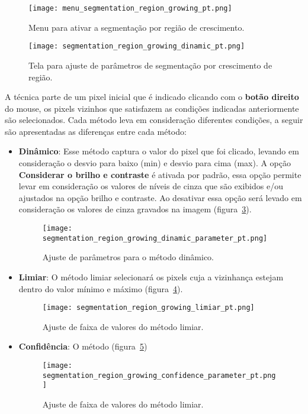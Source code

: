 \begin{figure}[!htb]
\centering
\texttt{[image: menu\_segmentation\_region\_growing\_pt.png]}
\caption{Menu para ativar a segmentação por região de crescimento.}
\label{fig:menu_segmentation_region_growing}
\end{figure}

\begin{figure}[!htb]
\centering
\texttt{[image: segmentation\_region\_growing\_dinamic\_pt.png]}
\caption{Tela para ajuste de parâmetros de segmentação por crescimento de região.}
\label{fig:segmentation_region_growing_dinamic}
\end{figure}

A técnica parte de um pixel inicial que é indicado clicando com o \textbf{botão direito} do mouse, os pixels vizinhos que satisfazem as condições indicadas anteriormente são selecionados. Cada método leva em consideração diferentes condições, a seguir são apresentadas as diferenças entre cada método:

\begin{itemize}
	\item \textbf{Dinâmico}: Esse método captura o valor do pixel que foi clicado, levando em consideração o desvio para baixo (min) e desvio para cima (max). A opção \textbf{Considerar o brilho e contraste} é ativada por padrão, essa opção permite levar em consideração os valores de níveis de cinza que são exibidos e/ou ajustados na opção brilho e contraste. Ao desativar essa opção será levado em consideração os valores de cinza gravados na imagem (figura~\ref{fig:segmentation_region_growing_dinamic_parameter}). 
	
	\begin{figure}[!htb]
	\centering
	\texttt{[image: segmentation\_region\_growing\_dinamic\_parameter\_pt.png]}
	\caption{Ajuste de parâmetros para o método dinâmico.}
	\label{fig:segmentation_region_growing_dinamic_parameter}
	\end{figure}
	
	\item \textbf{Limiar}: O método limiar selecionará os pixels cuja a vizinhança estejam dentro do valor mínimo e máximo (figura~\ref{fig:segmentation_region_growing_limiar}).

	\begin{figure}[!htb]
	\centering
	\texttt{[image: segmentation\_region\_growing\_limiar\_pt.png]}
	\caption{Ajuste de faixa de valores do método limiar.}
	\label{fig:segmentation_region_growing_limiar}
	\end{figure}	
	
	\item \textbf{Confidência}: O método (figura~\ref{fig:segmentation_region_growing_confidence_parameter})
	
	\begin{figure}[!htb]
	\centering
	\texttt{[image: segmentation\_region\_growing\_confidence\_parameter\_pt.png]}
	\caption{Ajuste de faixa de valores do método limiar.}
	\label{fig:segmentation_region_growing_confidence_parameter}
	\end{figure}	
	
	
\end{itemize}
